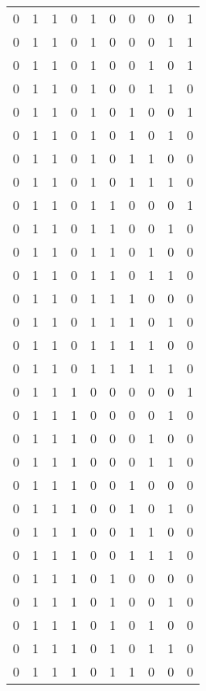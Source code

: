 \begin{longtable}[c]{rrrrrrrrrr}
        0 & 1 & 1 & 0 & 1 & 0 & 0 & 0 & 0 & 1 \\
        0 & 1 & 1 & 0 & 1 & 0 & 0 & 0 & 1 & 1 \\
        0 & 1 & 1 & 0 & 1 & 0 & 0 & 1 & 0 & 1 \\
        0 & 1 & 1 & 0 & 1 & 0 & 0 & 1 & 1 & 0 \\
        0 & 1 & 1 & 0 & 1 & 0 & 1 & 0 & 0 & 1 \\
        0 & 1 & 1 & 0 & 1 & 0 & 1 & 0 & 1 & 0 \\
        0 & 1 & 1 & 0 & 1 & 0 & 1 & 1 & 0 & 0 \\
        0 & 1 & 1 & 0 & 1 & 0 & 1 & 1 & 1 & 0 \\
        0 & 1 & 1 & 0 & 1 & 1 & 0 & 0 & 0 & 1 \\
        0 & 1 & 1 & 0 & 1 & 1 & 0 & 0 & 1 & 0 \\
        0 & 1 & 1 & 0 & 1 & 1 & 0 & 1 & 0 & 0 \\
        0 & 1 & 1 & 0 & 1 & 1 & 0 & 1 & 1 & 0 \\
        0 & 1 & 1 & 0 & 1 & 1 & 1 & 0 & 0 & 0 \\
        0 & 1 & 1 & 0 & 1 & 1 & 1 & 0 & 1 & 0 \\
        0 & 1 & 1 & 0 & 1 & 1 & 1 & 1 & 0 & 0 \\
        0 & 1 & 1 & 0 & 1 & 1 & 1 & 1 & 1 & 0 \\
        0 & 1 & 1 & 1 & 0 & 0 & 0 & 0 & 0 & 1 \\
        0 & 1 & 1 & 1 & 0 & 0 & 0 & 0 & 1 & 0 \\
        0 & 1 & 1 & 1 & 0 & 0 & 0 & 1 & 0 & 0 \\
        0 & 1 & 1 & 1 & 0 & 0 & 0 & 1 & 1 & 0 \\
        0 & 1 & 1 & 1 & 0 & 0 & 1 & 0 & 0 & 0 \\
        0 & 1 & 1 & 1 & 0 & 0 & 1 & 0 & 1 & 0 \\
        0 & 1 & 1 & 1 & 0 & 0 & 1 & 1 & 0 & 0 \\
        0 & 1 & 1 & 1 & 0 & 0 & 1 & 1 & 1 & 0 \\
        0 & 1 & 1 & 1 & 0 & 1 & 0 & 0 & 0 & 0 \\
        0 & 1 & 1 & 1 & 0 & 1 & 0 & 0 & 1 & 0 \\
        0 & 1 & 1 & 1 & 0 & 1 & 0 & 1 & 0 & 0 \\
        0 & 1 & 1 & 1 & 0 & 1 & 0 & 1 & 1 & 0 \\
        0 & 1 & 1 & 1 & 0 & 1 & 1 & 0 & 0 & 0 \\

\end{longtable}
